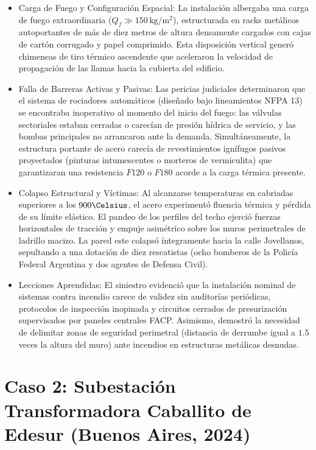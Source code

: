 \begin{itemize}
    \item Carga de Fuego y Configuración Espacial: La instalación albergaba una carga de fuego extraordinaria ($Q_f \gg
          150\,\mathrm{kg/m^2}$), estructurada en racks metálicos autoportantes de más de diez metros de altura densamente
          cargados con cajas de cartón corrugado y papel comprimido. Esta disposición vertical generó chimeneas de tiro
          térmico ascendente que aceleraron la velocidad de propagación de las llamas hacia la cubierta del edificio.
    \item Falla de Barreras Activas y Pasivas: Las pericias judiciales determinaron que el sistema de rociadores
          automáticos (diseñado bajo lineamientos NFPA 13) se encontraba inoperativo al momento del inicio del fuego: las
          válvulas sectoriales estaban cerradas o carecían de presión hídrica de servicio, y las bombas principales no
          arrancaron ante la demanda. Simultáneamente, la estructura portante de acero carecía de revestimientos ignífugos
          pasivos proyectados (pinturas intumescentes o morteros de vermiculita) que garantizaran una resistencia $F120$ o
          $F180$ acorde a la carga térmica presente.
    \item Colapso Estructural y Víctimas: Al alcanzarse temperaturas en cabriadas superiores a los $900\Celsius$, el
          acero experimentó fluencia térmica y pérdida de su límite elástico. El pandeo de los perfiles del techo ejerció
          fuerzas horizontales de tracción y empuje asimétrico sobre los muros perimetrales de ladrillo macizo. La pared
          este colapsó íntegramente hacia la calle Jovellanos, sepultando a una dotación de diez rescatistas (ocho bomberos
          de la Policía Federal Argentina y dos agentes de Defensa Civil).
    \item Lecciones Aprendidas: El siniestro evidenció que la instalación nominal de sistemas contra incendio carece de
          validez sin auditorías periódicas, protocolos de inspección inopinada y circuitos cerrados de presurización
          supervisados por paneles centrales FACP. Asimismo, demostró la necesidad de delimitar zonas de seguridad
          perimetral (distancia de derrumbe igual a $1.5$ veces la altura del muro) ante incendios en estructuras metálicas
          desnudas.
\end{itemize}

\section{Caso 2: Subestación Transformadora Caballito de Edesur (Buenos Aires, 2024)}
\label{sec.cap8:edesur_caballito}

